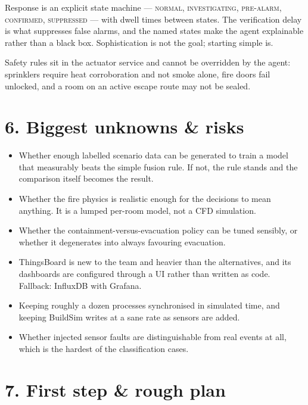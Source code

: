 Response is an explicit state machine --- \textsc{normal}, \textsc{investigating},
\textsc{pre-alarm}, \textsc{confirmed}, \textsc{suppressed} --- with dwell times
between states. The verification delay is what suppresses false alarms, and the
named states make the agent explainable rather than a black box. Sophistication is
not the goal; starting simple is.

Safety rules sit in the actuator service and cannot be overridden by the agent:
sprinklers require heat corroboration and not smoke alone, fire doors fail
unlocked, and a room on an active escape route may not be sealed.

\section{6. Biggest unknowns \& risks}

\begin{itemize}[leftmargin=1.4em, itemsep=1pt]
  \item Whether enough labelled scenario data can be generated to train a model
        that measurably beats the simple fusion rule. If not, the rule stands and
        the comparison itself becomes the result.
  \item Whether the fire physics is realistic enough for the decisions to mean
        anything. It is a lumped per-room model, not a CFD simulation.
  \item Whether the containment-versus-evacuation policy can be tuned sensibly, or
        whether it degenerates into always favouring evacuation.
  \item ThingsBoard is new to the team and heavier than the alternatives, and its
        dashboards are configured through a UI rather than written as code.
        Fallback: InfluxDB with Grafana.
  \item Keeping roughly a dozen processes synchronised in simulated time, and
        keeping BuildSim writes at a sane rate as sensors are added.
  \item Whether injected sensor faults are distinguishable from real events at
        all, which is the hardest of the classification cases.
\end{itemize}

\section{7. First step \& rough plan}

